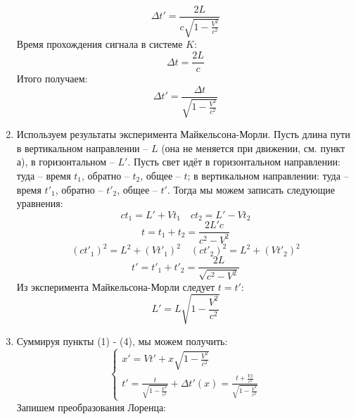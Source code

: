 \documentclass[12pt]{article}
\begin{document}
\begin{enumerate}
        \begin{equation}
            \Delta t'=\frac{2L}{c\sqrt{1-\frac{V^2}{c^2}}}
        \end{equation}
        Время прохождения сигнала в системе $K$:
        \begin{equation}
            \Delta t=\frac{2L}{c}
        \end{equation}
        Итого получаем:
        \begin{equation}
            \Delta t' = \frac{\Delta t}{\sqrt{1-\frac{V^2}{c^2}}}
        \end{equation}
        \item Используем результаты эксперимента Майкельсона-Морли. Пусть длина пути в вертикальном направлении -- $L$ (она не меняется при движении, см. пункт а), в горизонтальном -- $L'$. Пусть свет идёт в горизонтальном направлении: туда -- время $t_1$, обратно -- $t_2$, общее -- $t$; в вертикальном направлении: туда -- время $t'_1$, обратно -- $t'_2$, общее -- $t'$. Тогда мы можем записать следующие уравнения:
        \begin{equation}
            ct_1=L'+Vt_1 \quad ct_2=L'-Vt_2
        \end{equation}
        \begin{equation}
            t = t_1 + t_2 = \frac{2L'c}{c^2-V^2}
        \end{equation}
        \begin{equation}
            (ct'_1)^2 = L^2+(Vt'_1)^2\quad (ct'_2)^2 = L^2+(Vt'_2)^2
        \end{equation}
        \begin{equation}
            t' = t'_1 + t'_2 = \frac{2L}{\sqrt{c^2-V^2}}
        \end{equation}
        Из эксперимента Майкельсона-Морли следует $t=t'$:
        \begin{equation}
            L' = L\sqrt{1-\frac{V^2}{c^2}}
        \end{equation}
        \item Суммируя пункты (1) - (4), мы можем получить:
        \begin{equation}
        \begin{cases}
        x' = Vt'+x\sqrt{1-\frac{V^2}{c^2}}\\
        t' = \frac{t}{\sqrt{1-\frac{V^2}{c^2}}}+\Delta t'(x) = \frac{t+\frac{Vx}{c^2}}{\sqrt{1-\frac{V^2}{c^2}}}
        \end{cases}
        \end{equation}
        Запишем преобразования Лоренца:

\end{enumerate}
\end{document}
